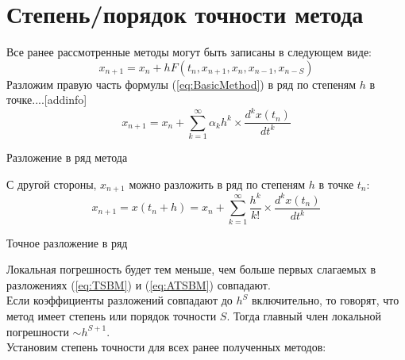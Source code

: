 \documentclass[a4paper,11pt]{article}
\begin{document}
\section{Степень/порядок точности метода\protect\footnotemark}
Все ранее рассмотренные методы могут быть записаны в следующем виде:
\begin{equation}
  x_{n+1} = x_n + hF(t_n, x_{n+1}, x_n, x_{n-1}, x_{n-S})
  \label{eq:BasicMethod}
\end{equation}
Разложим правую часть формулы (\ref{eq:BasicMethod}) в ряд по степеням $h$ в точке....[addinfo]
\begin{equation}
  x_{n+1} = x_n + \sum_{k=1}^{\infty} \alpha_kh^k \times \frac{d^kx(t_n)}{dt^k}
  \label{eq:TSBM}
\end{equation}
\begin{center}
  \small{Разложение в ряд метода}
\end{center}
С другой стороны, $x_{n+1}$ можно разложить в ряд по степеням $h$ в точке $t_n$:
\begin{equation}
  x_{n+1} = x(t_n + h) = x_n + \sum_{k=1}^{\infty} \frac{h^k}{k!} \times \frac{d^kx(t_n)}{dt^k}
  \label{eq:ATSBM}
\end{equation}
\begin{center}
  \small{Точное разложение в ряд}
\end{center}
Локальная погрешность будет тем меньше, чем больше первых слагаемых в разложениях (\ref{eq:TSBM}) и (\ref{eq:ATSBM}) совпадают. \\
Если коэффициенты разложений совпадают до $h^S$ включительно, то говорят, что метод имеет степень или порядок точности $S$.
  Тогда главный член локальной погрешности $\sim h^{S+1}$. \\
Установим степень точности для всех ранее полученных методов:
\end{document}

